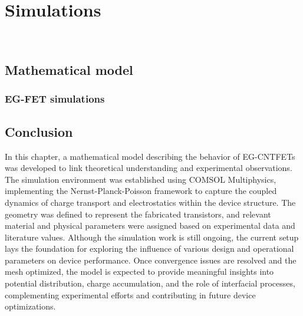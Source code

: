 \chapter{Simulations}
\label{cap:chapter5}

\newpage
\thispagestyle{empty}
\ %
\newpage


\section{Mathematical model}
\label{sec:model}




\subsection{EG-FET simulations}
\label{sec:EGFET_simulations}




\section{Conclusion}

In this chapter, a mathematical model describing the behavior of EG-CNTFETs was developed to link theoretical understanding and experimental observations. The simulation environment was established using COMSOL Multiphysics, implementing the Nernst-Planck-Poisson framework to capture the coupled dynamics of charge transport and electrostatics within the device structure. The geometry was defined to represent the fabricated transistors, and relevant material and physical parameters were assigned based on experimental data and literature values. Although the simulation work is still ongoing, the current setup lays the foundation for exploring the influence of various design and operational parameters on device performance. Once convergence issues are resolved and the mesh optimized, the model is expected to provide meaningful insights into potential distribution, charge accumulation, and the role of interfacial processes, complementing experimental efforts and contributing in future device optimizations.


\newpage
\thispagestyle{empty}
\ %
\newpage